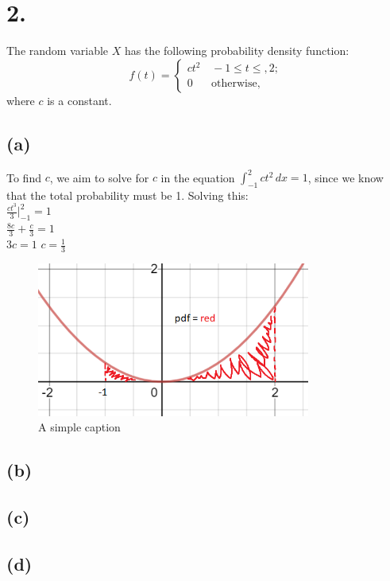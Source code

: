 \documentclass{article}
\begin{document}
\thispagestyle{firstpageheader}

\section*{2.}
{\Large
The random variable $X$ has the following probability density function:
\[
f\left(t\right)=\begin{cases}
ct^{2} & \,-1\le t\le,2;\\
0 & \,\mbox{otherwise,}
\end{cases}
\]
where $c$ is a constant.

\subsection*{(a)}
To find $c$, we aim to solve for $c$ in the equation $\int_{-1}^{2}  ct^2\,dx = 1$, since we know that the total probability must be 1. Solving this: \\ 
$\frac{ct^3}{3}|_{-1}^{2} = 1$ \\ 
$\frac{8c}{3} + \frac{c}{3} = 1$ \\ 
$3c = 1$
$c = \frac{1}{3}$

\begin{figure}[ht!]
  \centering
  \includegraphics[width=90mm]{pdf.PNG}
  \caption{A simple caption \label{overflow}}
\end{figure}

\subsection*{(b)}


\subsection*{(c)}


\subsection*{(d)}


}
\end{document}
